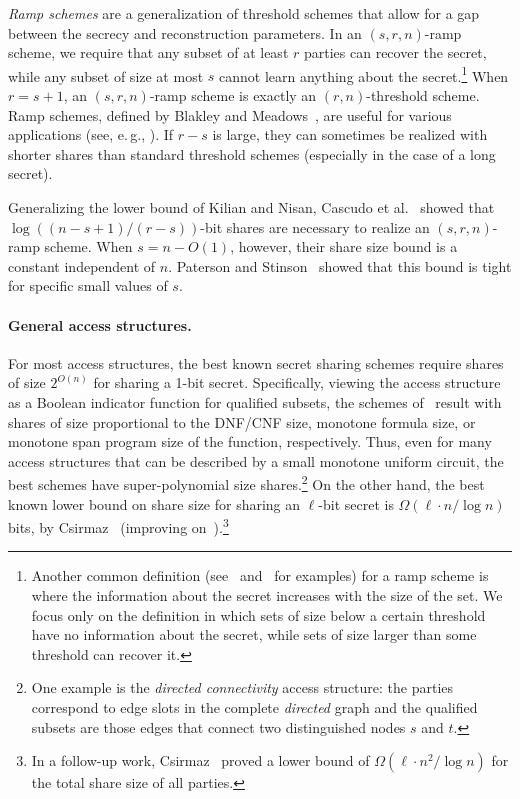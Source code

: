 \documentclass[11pt]{article}
\numberwithin{equation}{section}
\theoremstyle{definition}
\theoremstyle{plain}
\newcommand{\eg}{e.\,g.}
\begin{document}
\emph{Ramp schemes} are a generalization of threshold schemes that allow for a 
gap between the secrecy and reconstruction parameters. In an $(s,r,n)$-ramp scheme, we
require that any subset of at least $r$ parties can recover the secret, while
any subset of size at most $s$ cannot learn anything about the
secret.\footnote{Another common definition (see~\cite[Definition 2.7]{FarrasHKP14} and~\cite[Example 2.11]{MolleviMP16} for examples) for a ramp scheme is where the
	information about the secret increases with the size of the set. 
We focus only
on the definition in which sets of size below a certain threshold have no
information about the secret, while sets of size larger than some threshold
can recover it.}  When $r=s+1$, an $(s,r,n)$-ramp scheme is exactly an
$(r,n)$-threshold scheme. Ramp schemes, defined by Blakley and
Meadows~\cite{BlakleyM84}, are useful for various applications (see,
\eg, \cite{FranklinY92,StinsonW99,ChenC06,MartinPS11}). If $r-s$ is large, they
can sometimes be realized with shorter shares than standard threshold schemes
(especially in the case of a long secret).

Generalizing the lower bound of Kilian and Nisan, Cascudo et al.~\cite{PueyoCX13} 
showed that $\log((n-s+1)/(r-s))$-bit shares are necessary to realize an
$(s,r,n)$-ramp scheme.   When $s = n - O(1)$, however, their share size bound
is a constant independent of $n$. Paterson and Stinson~\cite{PatersonS13} showed that this bound is tight for specific small values of $s$.

\paragraph{General access structures.}
For most access structures, the best known secret sharing schemes require shares
of size $2^{O(n)}$ for sharing a 1-bit secret. Specifically, viewing the access
structure as a Boolean indicator function for qualified subsets, the schemes of~\cite{ISN93,Leichter88,KarchmerW93} result with shares of size proportional to
the DNF/CNF size, monotone formula size, or monotone span program size of the
function, respectively. Thus, even for many access structures that can be
described by a small monotone uniform circuit, the best schemes have super-polynomial size shares.\footnote{One example is the \emph{directed
connectivity} access structure: the parties correspond to edge slots in the
complete \emph{directed} graph and the qualified subsets are those edges that
connect two distinguished nodes $s$ and $t$.}  On the other hand, the best
known lower bound on share size for sharing an $\ell$-bit secret is 
$\Omega(\ell\cdot n/\log{n})$ bits, by Csirmaz~\cite{Csirmaz97} (improving 
on~\cite{CapocelliSGV93}).\footnote{In a follow-up work,
Csirmaz~\cite{csirmaz1996dealer}  proved a lower bound of 
$\Omega(\ell\cdot n^2/ \log n)$ for the total share size of all parties.}
\end{document}
